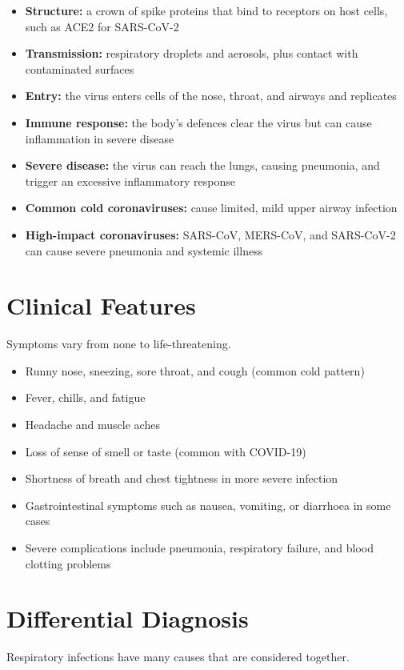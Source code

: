 \begin{itemize}
    \item \textbf{Structure:} a crown of spike proteins that bind to receptors on host cells, such as ACE2 for SARS-CoV-2
    \item \textbf{Transmission:} respiratory droplets and aerosols, plus contact with contaminated surfaces
    \item \textbf{Entry:} the virus enters cells of the nose, throat, and airways and replicates
    \item \textbf{Immune response:} the body's defences clear the virus but can cause inflammation in severe disease
    \item \textbf{Severe disease:} the virus can reach the lungs, causing pneumonia, and trigger an excessive inflammatory response
    \item \textbf{Common cold coronaviruses:} cause limited, mild upper airway infection
    \item \textbf{High-impact coronaviruses:} SARS-CoV, MERS-CoV, and SARS-CoV-2 can cause severe pneumonia and systemic illness
\end{itemize}

\section*{Clinical Features}
Symptoms vary from none to life-threatening.

\begin{itemize}
    \item Runny nose, sneezing, sore throat, and cough (common cold pattern)
    \item Fever, chills, and fatigue
    \item Headache and muscle aches
    \item Loss of sense of smell or taste (common with COVID-19)
    \item Shortness of breath and chest tightness in more severe infection
    \item Gastrointestinal symptoms such as nausea, vomiting, or diarrhoea in some cases
    \item Severe complications include pneumonia, respiratory failure, and blood clotting problems
\end{itemize}

\section*{Differential Diagnosis}
Respiratory infections have many causes that are considered together.

